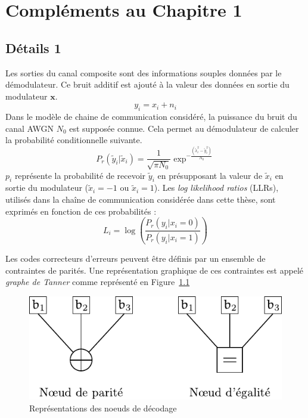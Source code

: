 
\appendix

\chapter{Compléments au Chapitre 1}
\section{Détails 1}\label{append:decoding_nodes}

Les sorties du canal composite sont des informations souples données par le démodulateur.
Ce bruit additif est ajouté à la valeur des données en sortie du modulateur $\mathbold{x}$.
\begin{equation}
y_i = x_i + n_i
\end{equation}
Dans le modèle de chaine de communication considéré, la puissance du bruit du canal AWGN $N_0$ est supposée connue.
Cela permet au démodulateur de calculer la probabilité conditionnelle suivante.
\begin{equation}
	P_r( \tilde{y}_i|\tilde{x}_i) = \dfrac{1}{\sqrt{\pi N_0}}\exp^{-\tfrac{(\tilde{x}_i^2-\tilde{y}_i^2)}{N_0}}
\end{equation}
$p_i$ représente la probabilité de recevoir $\tilde{y}_i$ en présupposant la valeur de $\tilde{x}_i$ en sortie du modulateur ($\tilde{x}_i=-1$ ou $\tilde{x}_i=1$). Les \textit{log likelihood ratios} (LLRs), utilisés dans la chaîne de communication considérée dans cette thèse, sont exprimés en fonction de ces probabilités :
\begin{equation}
	L_i = \log\left(\dfrac{P_r(y_i | x_i = 0)}{P_r(y_i | x_i = 1)}
	\label{eq:lr}\right)
\end{equation}

Les codes correcteurs d'erreurs peuvent être définis par un ensemble de contraintes de parités. Une représentation graphique de ces contraintes est appelé \textit{graphe de Tanner} comme représenté en Figure~\ref{fig:noeuds}

\begin{figure}[t]
\centering
\includegraphics{tail/appendix_1_fig/noeuds}
\caption{Représentations des noeuds de décodage}
\label{fig:noeuds}
\end{figure}

